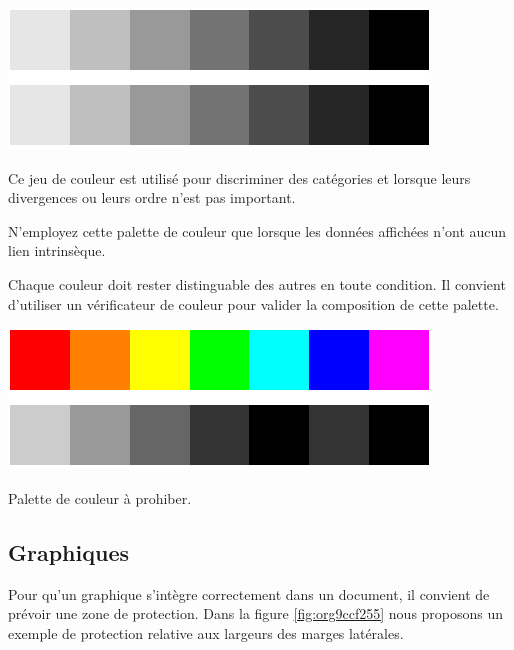 \documentclass[a4paper,12pt]{article}
\begin{document}
\begin{multicols}{2}
\begin{center}
\includegraphics[width=.9\linewidth]{./img/palette-categorique.pdf}
\end{center}

Ce jeu de couleur est utilisé pour discriminer des catégories et lorsque leurs divergences ou leurs ordre n'est pas important.\autocite{andreaskrauseBestPracticesData2024}

N'employez cette palette de couleur que lorsque les données affichées n'ont aucun lien intrinsèque. \autocite{wilkeColorScales2019}

Chaque couleur doit rester distinguable des autres en toute condition.\autocite{wilkeRedundantCoding2019} Il convient d'utiliser un vérificateur de couleur pour valider la composition de cette palette.\autocite{andreaskrauseBestPracticesData2024}

\begin{center}
\includegraphics[width=.9\linewidth]{./img/palette-arc-en-ciel.pdf}
\end{center}

Palette de couleur à prohiber.\autocite{wilkeCommonPitfallsColor2019}
\subsection{Graphiques}
\label{sec:orge639199}
Pour qu'un graphique s'intègre correctement dans un document, il convient de prévoir une zone de protection. Dans la figure \ref{fig:org9ccf255} nous proposons un exemple de protection relative aux largeurs des marges latérales.


\end{multicols}
\end{document}
